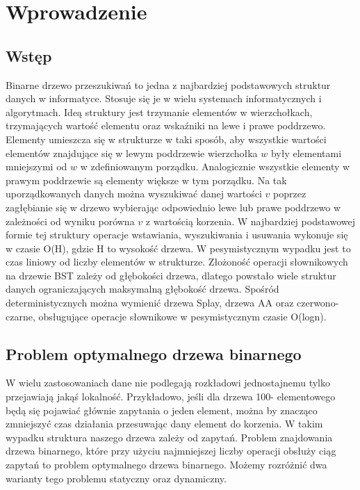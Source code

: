 \documentclass[declaration,shortabstract]{iithesis}
\author         {Julia Majkowska}
\theoremstyle{remark}
\theoremstyle{plain}
\theoremstyle{plain}
\theoremstyle{plain}
\begin{document}

  

\chapter{Wprowadzenie}  

\section{Wstęp}  

Binarne drzewo przeszukiwań to jedna z najbardziej podstawowych struktur danych w informatyce. Stosuje się je w wielu systemach informatycznych i algorytmach. Ideą struktury jest trzymanie elementów w wierzchołkach, trzymających wartość elementu oraz wskaźniki na lewe i prawe poddrzewo. Elementy umieszcza się w strukturze w taki sposób, aby wszystkie wartości elementów znajdujące się w lewym poddrzewie wierzchołka \(w\) były elementami mniejszymi od \(w\) w zdefiniowanym porządku. Analogicznie wszystkie elementy w prawym poddrzewie są elementy większe w tym porządku. Na tak uporządkowanych danych można wyszukiwać danej wartości \(v\) poprzez zagłębianie się w drzewo wybierając odpowiednio lewe lub prawe poddrzewo w zależności od wyniku porówna \(v\) z wartością korzenia. W najbardziej podstawowej formie tej struktury operacje wstawiania, wyszukiwania i usuwania wykonuje się w czasie O(H), gdzie H to wysokość drzewa. W pesymistycznym wypadku jest to czas liniowy od liczby elementów w strukturze. Złożoność operacji słownikowych na drzewie BST zależy od głębokości drzewa, dlatego powstało wiele struktur danych ograniczających maksymalną głębokość drzewa. Spośród deterministycznych można wymienić drzewa Splay, drzewa AA oraz czerwono-czarne, obsługujące operacje słownikowe w pesymistycznym czasie O(logn).  

 

\section{Problem optymalnego drzewa binarnego}  

W wielu zastosowaniach dane nie podlegają rozkładowi jednostajnemu tylko przejawiają jakąś lokalność. Przykładowo, jeśli dla drzewa 100- elementowego będą się pojawiać głównie zapytania o jeden element, można by znacząco zmniejszyć czas działania przesuwając dany element do korzenia. W takim wypadku struktura naszego drzewa zależy od zapytań. Problem znajdowania drzewa binarnego, które przy użyciu najmniejszej liczby operacji obsłuży ciąg zapytań to problem optymalnego drzewa binarnego. Możemy rozróżnić dwa warianty tego problemu statyczny oraz dynamiczny.  
\end{document}
